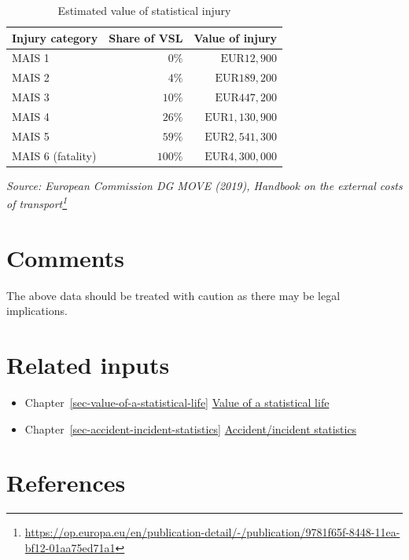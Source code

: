 \documentclass[
  11pt,
  a4paper,
]{book}
\DeclareRobustCommand{\href}[2]{#2\footnote{\url{#1}}}
\begin{document}
\hypertarget{tbl-value-of-injury}{}
\setlength{\LTpost}{0mm}
\begin{longtable}{lrr}
\caption{\label{tbl-value-of-injury}Estimated value of statistical injury }\tabularnewline

\toprule
Injury category & Share of VSL & Value of injury \\ 
\midrule
MAIS 1 & $0\%$ & $\text{EUR}12,900$ \\ 
MAIS 2 & $4\%$ & $\text{EUR}189,200$ \\ 
MAIS 3 & $10\%$ & $\text{EUR}447,200$ \\ 
MAIS 4 & $26\%$ & $\text{EUR}1,130,900$ \\ 
MAIS 5 & $59\%$ & $\text{EUR}2,541,300$ \\ 
MAIS 6 (fatality) & $100\%$ & $\text{EUR}4,300,000$ \\ 
\bottomrule
\end{longtable}
\begin{minipage}{\linewidth}
\emph{\href{https://op.europa.eu/en/publication-detail/-/publication/9781f65f-8448-11ea-bf12-01aa75ed71a1}{Source: European Commission DG MOVE (2019), Handbook on the external costs of transport}}\\
\end{minipage}

\hypertarget{comments-5}{%
\section{Comments}\label{comments-5}}

The above data should be treated with caution as there may be legal
implications.

\hypertarget{related-inputs-16}{%
\section{Related inputs}\label{related-inputs-16}}

\begin{itemize}
\item
  Chapter~\ref{sec-value-of-a-statistical-life}
  \protect\hyperlink{sec-value-of-a-statistical-life}{Value of a
  statistical life}
\item
  Chapter~\ref{sec-accident-incident-statistics}
  \protect\hyperlink{sec-accident-incident-statistics}{Accident/incident
  statistics}
\end{itemize}

\hypertarget{references-18}{%
\section{References}\label{references-18}}
\end{document}
